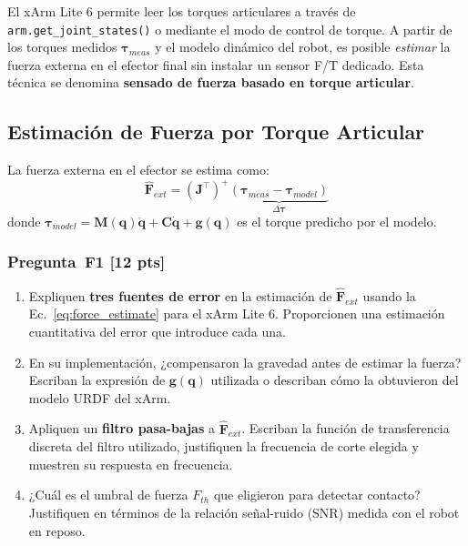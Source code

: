 \documentclass[journal,10pt,twoside]{IEEEtran}
\newcommand{\pts}[1]{\textcolor{tec_red}{\textbf{[#1 pts]}}}
\begin{document}
\begin{theorybox}
  El xArm Lite 6 permite leer los torques articulares a través de
  \texttt{arm.get\_joint\_states()} o mediante el modo de control de
  torque. A partir de los torques medidos $\bm{\tau}_{meas}$ y el
  modelo dinámico del robot, es posible \emph{estimar} la fuerza
  externa en el efector final sin instalar un sensor F/T dedicado.
  Esta técnica se denomina \textbf{sensado de fuerza basado en torque articular}.
\end{theorybox}

\subsection{Estimación de Fuerza por Torque Articular}

La fuerza externa en el efector se estima como:
\begin{equation}
  \hat{\bm{F}}_{ext} = \left(\bm{J}^\top\right)^+
    \underbrace{\left(\bm{\tau}_{meas} - \bm{\tau}_{model}\right)}_{\Delta\bm{\tau}}
  \label{eq:force_estimate}
\end{equation}
donde $\bm{\tau}_{model} = \bm{M}(\bm{q})\ddot{\bm{q}} +
\bm{C}\dot{\bm{q}} + \bm{g}(\bm{q})$ es el torque predicho por el modelo.

\subsubsection*{Pregunta~F1 \pts{12}}
\begin{enumerate}[label=(\alph*)]
  \item Expliquen \textbf{tres fuentes de error} en la estimación de
        $\hat{\bm{F}}_{ext}$ usando la Ec.~\eqref{eq:force_estimate}
        para el xArm Lite 6. Proporcionen una estimación cuantitativa
        del error que introduce cada una.
  \item En su implementación, ¿compensaron la gravedad antes de estimar
        la fuerza? Escriban la expresión de $\bm{g}(\bm{q})$ utilizada
        o describan cómo la obtuvieron del modelo URDF del xArm.
  \item Apliquen un \textbf{filtro pasa-bajas} a $\hat{\bm{F}}_{ext}$.
        Escriban la función de transferencia discreta del filtro
        utilizado, justifiquen la frecuencia de corte elegida
        y muestren su respuesta en frecuencia.
  \item ¿Cuál es el umbral de fuerza $F_{th}$ que eligieron para
        detectar contacto? Justifiquen en términos de la relación
        señal-ruido (SNR) medida con el robot en reposo.
\end{enumerate}
\end{document}

